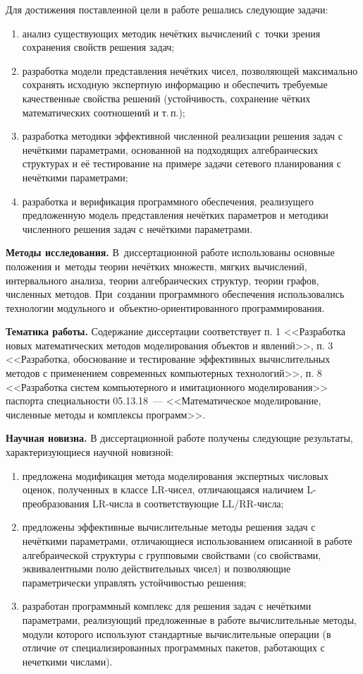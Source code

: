 Для достижения поставленной цели в работе решались следующие задачи:
\begin{enumerate}
  \item анализ существующих методик нечётких вычислений с~точки зрения сохранения свойств решения задач;
  \item разработка модели представления нечётких чисел, позволяющей максимально сохранять исходную экспертную информацию и обеспечить требуемые качественные свойства решений (устойчивость, сохранение чётких математических соотношений и т.\,п.);
  \item разработка методики эффективной численной реализации решения задач с нечёткими параметрами, основанной на подходящих алгебраических структурах и её тестирование на примере задачи сетевого планирования с нечёткими параметрами;
  \item разработка и верификация программного обеспечения, реализущего предложенную модель представления нечётких параметров и методики численного решения задач с нечёткими параметрами.
\end{enumerate}

\textbf{Методы исследования.} В~диссертационной работе использованы основные положения и~методы теории нечётких множеств, мягких вычислений, интервального анализа, теории алгебраических структур, теории графов, численных методов. При~создании программного обеспечения использовались технологии модульного и~объектно-ориентированного программирования.

\textbf{Тематика работы.} Содержание диссертации соответствует п. 1 <<Разработка новых математических методов моделирования объектов и явлений>>, п. 3 <<Разработка, обоснование и тестирование эффективных вычислительных методов с применением современных компьютерных технологий>>, п. 8 <<Разработка систем компьютерного и имитационного моделирования>> паспорта специальности 05.13.18~--- <<Математическое моделирование, численные методы и комплексы программ>>.

\textbf{Научная новизна.} В диссертационной работе получены следующие результаты, характеризующиеся научной новизной:
\begin{enumerate}
  \item предложена модификация метода моделирования экспертных числовых оценок, полученных в классе LR-чисел, отличающаяся наличием L-преобразования LR-числа в соответствующие LL/RR-числа;
  \item предложены эффективные вычислительные методы решения задач с нечёткими параметрами, отличающиеся использованием описанной в работе алгебраической структуры с групповыми свойствами (со свойствами, эквивалентными полю действительных чисел) и позволяющие параметрически управлять устойчивостью решения;
  \item разработан программный комплекс для решения задач с нечёткими параметрами, реализующий предложенные в работе вычислительные методы, модули которого используют стандартные вычислительные операции (в отличие от специализированных программных пакетов, работающих с нечеткими числами).
\end{enumerate}

